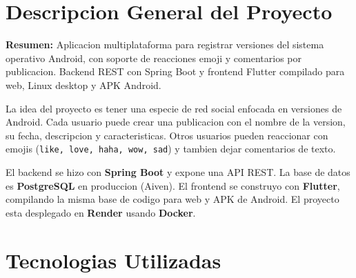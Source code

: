 \documentclass[12pt,a4paper]{article}
\begin{document}
\section{Descripcion General del Proyecto}

\begin{infobox}
\textbf{Resumen:} Aplicacion multiplataforma para registrar versiones del
sistema operativo Android, con soporte de reacciones emoji y comentarios
por publicacion. Backend REST con Spring Boot y frontend Flutter compilado
para web, Linux desktop y APK Android.
\end{infobox}

\vspace{0.5em}

La idea del proyecto es tener una especie de red social enfocada en
versiones de Android. Cada usuario puede crear una publicacion con el
nombre de la version, su fecha, descripcion y caracteristicas. Otros
usuarios pueden reaccionar con emojis (\texttt{like, love, haha, wow, sad}) y
tambien dejar comentarios de texto.

El backend se hizo con \textbf{Spring Boot} y expone una API REST. La
base de datos es \textbf{PostgreSQL} en produccion (Aiven). El frontend
se construyo con \textbf{Flutter}, compilando la misma base de codigo para
web y APK de Android. El proyecto esta desplegado en \textbf{Render}
usando \textbf{Docker}.

\section{Tecnologias Utilizadas}
\end{document}
